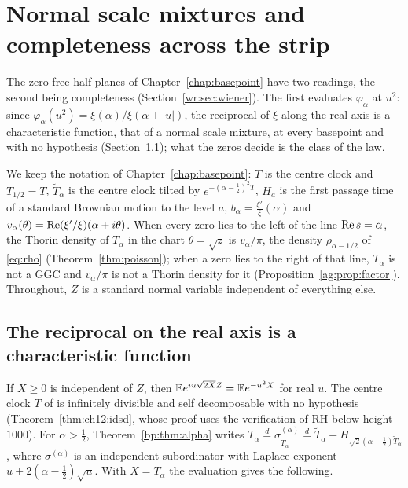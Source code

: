 \section{Normal scale mixtures and completeness across the strip}\label{ch:strip}

The zero free half planes of Chapter~\ref{chap:basepoint} have two readings, the second being completeness (Section~\ref{wr:sec:wiener}). The first evaluates $\varphi_\alpha$ at $u^2$: since $\varphi_\alpha(u^2)=\xi(\alpha)/\xi(\alpha+|u|)$, the reciprocal of $\xi$ along the real axis is a characteristic function, that of a normal scale mixture, at every basepoint and with no hypothesis (Section~\ref{sm:sec:cf}); what the zeros decide is the class of the law.

We keep the notation of Chapter~\ref{chap:basepoint}: $T$ is the centre clock and $T_{1/2}=T$, $\widetilde T_\alpha$ is the centre clock tilted by $e^{-(\alpha-\frac12)^2T}$, $H_a$ is the first passage time of a standard Brownian motion to the level $a$, $b_\alpha=\frac{\xi'}{\xi}(\alpha)$ and $v_\alpha(\theta)=\operatorname{Re}(\xi'/\xi)(\alpha+i\theta)$. When every zero lies to the left of the line $\operatorname{Re} s=\alpha$, the Thorin density of $T_\alpha$ in the chart $\theta=\sqrt z$ is $v_\alpha/\pi$, the density $\rho_{\alpha-1/2}$ of \eqref{eq:rho} (Theorem~\ref{thm:poisson}); when a zero lies to the right of that line, $T_\alpha$ is not a GGC and $v_\alpha/\pi$ is not a Thorin density for it (Proposition~\ref{ag:prop:factor}). Throughout, $Z$ is a standard normal variable independent of everything else.

\subsection{The reciprocal on the real axis is a characteristic function}\label{sm:sec:cf}

If $X\ge0$ is independent of $Z$, then $\mathbb{E} e^{iu\sqrt{2X}Z}=\mathbb{E} e^{-u^2X}$ for real $u$. The centre clock $T$ of \cite{P17} is infinitely divisible and self decomposable with no hypothesis (Theorem~\ref{thm:ch12:idsd}, whose proof uses the verification of RH below height $1000$). For $\alpha>\frac12$, Theorem~\ref{bp:thm:alpha} writes $T_\alpha\stackrel d=\sigma^{(\alpha)}_{\widetilde T_\alpha}\stackrel d=\widetilde T_\alpha+H_{\sqrt2(\alpha-\frac12)\widetilde T_\alpha}$, where $\sigma^{(\alpha)}$ is an independent subordinator with Laplace exponent $u+2(\alpha-\frac12)\sqrt u$. With $X=T_\alpha$ the evaluation gives the following.

